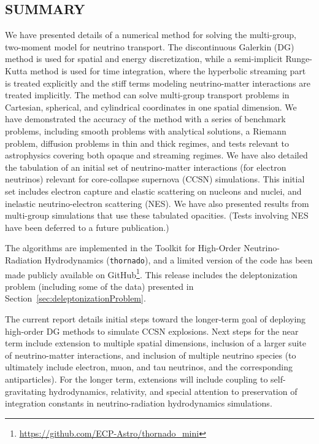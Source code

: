 \documentclass[11pt,letterpaper,twoside,english,final]{article}
\newcommand{\thornado}{\texttt{thornado}}
\begin{document}
\begin{center}
  \section{SUMMARY}
  \label{sec:summary}
\end{center}

We have presented details of a numerical method for solving the multi-group, two-moment model for neutrino transport.  
The discontinuous Galerkin (DG) method is used for spatial and energy discretization, while a semi-implicit Runge-Kutta method is used for time integration, where the hyperbolic streaming part is treated explicitly and the stiff terms modeling neutrino-matter interactions are treated implicitly.  
The method can solve multi-group transport problems in Cartesian, spherical, and cylindrical coordinates in one spatial dimension.  
We have demonstrated the accuracy of the method with a series of benchmark problems, including smooth problems with analytical solutions, a Riemann problem, diffusion problems in thin and thick regimes, and tests relevant to astrophysics covering both opaque and streaming regimes.  
We have also detailed the tabulation of an initial set of neutrino-matter interactions (for electron neutrinos) relevant for core-collapse supernova (CCSN) simulations.  
This initial set includes electron capture and elastic scattering on nucleons and nuclei, and inelastic neutrino-electron scattering (NES).  
We have also presented results from multi-group simulations that use these tabulated opacities.  
(Tests involving NES have been deferred to a future publication.)  

The algorithms are implemented in the Toolkit for High-Order Neutrino-Radiation Hydrodynamics (\thornado), and a limited version of the code has been made publicly available on GitHub\footnote{\url{https://github.com/ECP-Astro/thornado_mini}}.  
This release includes the deleptonization problem (including some of the data) presented in Section~\ref{sec:deleptonizationProblem}.  

The current report details initial steps toward the longer-term goal of deploying high-order DG methods to simulate CCSN explosions.  
Next steps for the near term include extension to multiple spatial dimensions, inclusion of a larger suite of neutrino-matter interactions, and inclusion of multiple neutrino species (to ultimately include electron, muon, and tau neutrinos, and the corresponding antiparticles).  
For the longer term, extensions will include coupling to self-gravitating hydrodynamics, relativity, and special attention to preservation of integration constants in neutrino-radiation hydrodynamics simulations.  
\end{document}
